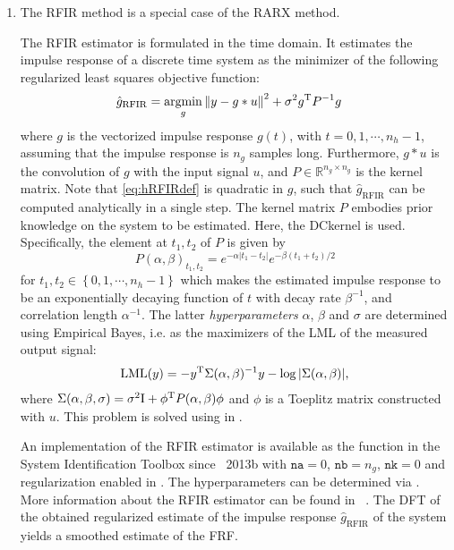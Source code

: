 \begin{enumerate}
\item \emph{}

The \gls{RFIR} method is a special case of the \gls{RARX} method. 

The \gls{RFIR} estimator is formulated in the time domain. 
It estimates the impulse response of a discrete time system as the minimizer of the following regularized least squares objective function:
\begin{align}\label{eq:hRFIRdef}
\hat g_{\mathrm{RFIR}} &= \operatorname*{argmin}_{g} \left\| y - g \ast u  \right\|_{}^2 + \sigma^2 g^{\mathrm{T}}P^{-1}g
\end{align}
where $g$ is the vectorized impulse response $g(t)$, with $t = 0,1,\cdots,n_h - 1$, assuming that the impulse response is $n_g$ samples long. 
Furthermore, $g\ast u$ is the convolution of $g$ with the input signal $u$, and $P\in \mathbb{R}^{n_g\times n_g}$ is the kernel matrix. 
Note that \eqref{eq:hRFIRdef} is quadratic in $g$, such that $\hat g_{\mathrm{RFIR}}$ can be computed analytically in a single step.
The kernel matrix $P$ embodies prior knowledge on the system to be estimated. 
Here, the \gls{DCkernel} is used. 
Specifically, the element at $t_1,t_2$ of $P$ is given by
\begin{equation}
P(\alpha,\beta)_{t_1,t_2} = e^{-\alpha|t_1 - t_2|}e^{-\beta(t_1 + t_2)/2}
\end{equation}
 for $t_1,t_2 \in \left\{0,1,\cdots,n_h - 1\right\}$ which makes the estimated impulse response to be an exponentially decaying function of $t$ with decay rate $\beta^{-1}$, and correlation length $\alpha^{-1}$. 
 The latter \emph{hyperparameters} $\alpha$, $\beta$ and $\sigma$ are determined using Empirical Bayes, i.e. as the maximizers of the \gls{LML} of the measured output signal:
\begin{align}
\mathrm{LML}(y) = -y^{\mathrm{T}}\Sigma(\alpha,\beta)^{-1}y - \log |\Sigma(\alpha,\beta)| \text{,}
\end{align}
where $\Sigma(\alpha,\beta, \sigma) = \sigma^2 \mathrm{I} + \phi^{\mathrm{T}}P(\alpha,\beta)\phi$ and $\phi$ is a Toeplitz matrix constructed with $u$. 
This problem is solved using  in \MATLAB.

An implementation of the \gls{RFIR} estimator is available as the  function in the System Identification Toolbox since \MATLAB~2013b with $\mathtt{na} = 0$, $\mathtt{nb} = n_g$, $\mathtt{nk}=0$ and regularization enabled in . 
The hyperparameters can be determined via .
More information about the \gls{RFIR} estimator can be found in
~\citep{Pillonetto2010,Chen2012}. 
The \gls{DFT} of the obtained regularized estimate of the impulse response $\hat g_{\mathrm{RFIR}}$ of the system yields a smoothed estimate of the FRF.
\end{enumerate}

